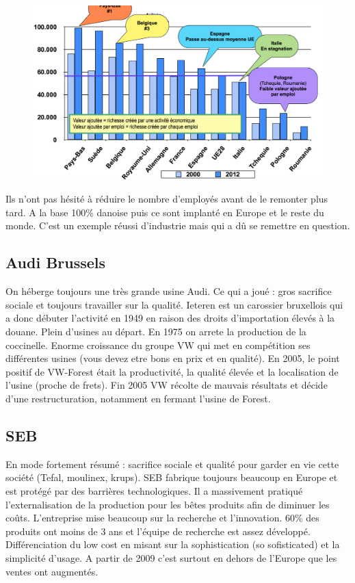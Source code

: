\begin{figure}
	\includegraphics[scale=0.29]{68}
\end{figure}
Ils n’ont pas hésité à réduire le nombre d'employés avant de le remonter plus tard. A la base 100\% danoise puis ce sont implanté en Europe et le reste du monde. C’est un exemple réussi d’industrie mais qui a dû se remettre en question. 

\subsection{Audi Brussels}
On héberge toujours une très grande usine Audi. Ce qui a joué : gros sacrifice sociale et toujours travailler sur la qualité. Ieteren est un carossier bruxellois qui a donc débuter l'activité en 1949 en raison des droits d'importation élevés à la douane. Plein d’usines au départ. En 1975 on arrete la production de la coccinelle. Enorme croissance du groupe VW qui met en compétition ses différentes usines (vous devez etre bons en prix et en qualité). En 2005, le point positif de VW-Forest était la productivité, la qualité élevée et la localisation de l'usine (proche de frets). Fin 2005 VW récolte de mauvais résultats et décide d'une restructuration, notamment en fermant l'usine de Forest.

\subsection{SEB}
En mode fortement résumé : sacrifice sociale et qualité pour garder en vie cette société (Tefal, moulinex, krups). SEB fabrique toujours beaucoup en Europe et est protégé par des barrières technologiques. Il a massivement pratiqué l’externalisation de la production pour les bêtes produits afin de diminuer les coûts. L'entreprise mise beaucoup sur la recherche et l'innovation. 60\% des produits ont moins de 3 ans et l'équipe de recherche est assez développé. Différenciation du low cost en misant sur la sophistication (so sofisticated) et la simplicité d'usage. A partir de 2009 c'est surtout en dehors de l'Europe que les ventes ont augmentés. 

